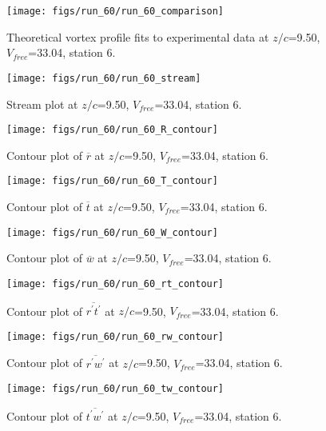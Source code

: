 \begin{figure}[H]
\centering
\texttt{[image: figs/run\_60/run\_60\_comparison]}
\caption{Theoretical vortex profile fits to experimental data at $z/c$=9.50, $V_{free}$=33.04, station 6.}
\label{fig:run_60_comparison}
\end{figure}


\begin{figure}[H]
\centering
\texttt{[image: figs/run\_60/run\_60\_stream]}
\caption{Stream plot at $z/c$=9.50, $V_{free}$=33.04, station 6.}
\label{fig:run_60_stream}
\end{figure}


\begin{figure}[H]
\centering
\texttt{[image: figs/run\_60/run\_60\_R\_contour]}
\caption{Contour plot of $\overline{r}$ at $z/c$=9.50, $V_{free}$=33.04, station 6.}
\label{fig:run_60_R_contour}
\end{figure}


\begin{figure}[H]
\centering
\texttt{[image: figs/run\_60/run\_60\_T\_contour]}
\caption{Contour plot of $\overline{t}$ at $z/c$=9.50, $V_{free}$=33.04, station 6.}
\label{fig:run_60_T_contour}
\end{figure}


\begin{figure}[H]
\centering
\texttt{[image: figs/run\_60/run\_60\_W\_contour]}
\caption{Contour plot of $\overline{w}$ at $z/c$=9.50, $V_{free}$=33.04, station 6.}
\label{fig:run_60_W_contour}
\end{figure}


\begin{figure}[H]
\centering
\texttt{[image: figs/run\_60/run\_60\_rt\_contour]}
\caption{Contour plot of $\overline{r^\prime t^\prime}$ at $z/c$=9.50, $V_{free}$=33.04, station 6.}
\label{fig:run_60_rt_contour}
\end{figure}


\begin{figure}[H]
\centering
\texttt{[image: figs/run\_60/run\_60\_rw\_contour]}
\caption{Contour plot of $\overline{r^\prime w^\prime}$ at $z/c$=9.50, $V_{free}$=33.04, station 6.}
\label{fig:run_60_rw_contour}
\end{figure}


\begin{figure}[H]
\centering
\texttt{[image: figs/run\_60/run\_60\_tw\_contour]}
\caption{Contour plot of $\overline{t^\prime w^\prime}$ at $z/c$=9.50, $V_{free}$=33.04, station 6.}
\label{fig:run_60_tw_contour}
\end{figure}


